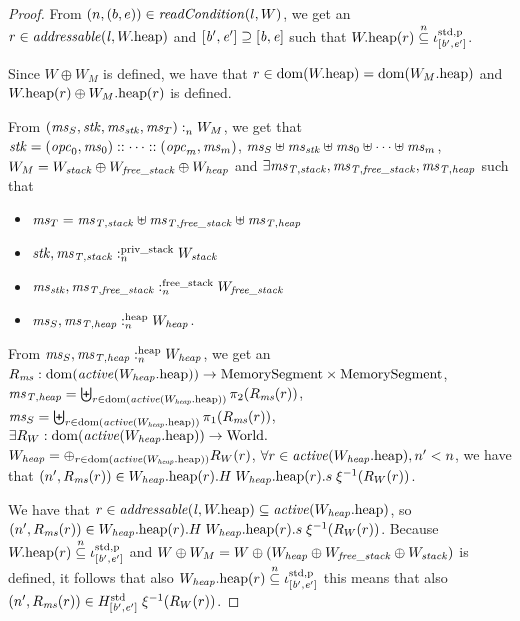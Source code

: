 \documentclass[a4paper]{article}
\begin{document}
\begin{proof}
  From $\npair{(b,e)}\in\readCond{l,W}$, we get an $r \in \addressable{\lin,
    \pwheap}$ and $[\baddr',\eaddr'] \supseteq [\baddr,\eaddr]$ such that $\pwheap(r)
  \nsubeq \stdreg{[\baddr',\eaddr']}{\pur}$.

  Since $W \oplus W_M$ is defined, we have that $r \in \dom(\pwheap) =
  \dom(\pwheap[W_M])$ and $\pwheap(r) \oplus \pwheap[W_M](r)$ is defined.

  From $\memSat{(\ms_S,\stk,\ms_\stk,\ms_T)}{W_M}$, we get that
  $\stk = (\opc_0,\ms_0):: \dots :: (\opc_m,\ms_m)$,
  $\ms_S \uplus \ms_\stk \uplus \ms_0 \uplus \dots \uplus \ms_m$,
  $W_M = W_{\var{stack}} \oplus W_{\var{free\_stack}} \oplus W_{\var{heap}}$ and
  $\exists \ms_\var{T,stack}, \ms_\var{T,free\_stack}, \ms_\var{T,heap}$ such that
  \begin{itemize}
  \item $\ms_T = \ms_\var{T,stack} \uplus \ms_\var{T,free\_stack} \uplus
    \ms_\var{T,heap}$
  \item $\memSatStack{\stk,\ms_\var{T,stack}}{W_{\var{stack}}}$
  \item $\memSatFStack{\ms_\stk,\ms_\var{T,free\_stack}}{W_{\var{free\_stack}}}$
  \item $\memSatHeap{\ms_S,\ms_\var{T,heap}}{W_\var{heap}}$.
  \end{itemize}

  From $\memSatHeap{\ms_S,\ms_\var{T,heap}}{W_\var{heap}}$, we get an
  $R_\ms : \dom(\activeReg{\pwheap[W_\var{heap}]}) \fun \MemSeg \times \MemSeg$,
  $\ms_\var{T,heap} = \biguplus_{r \in \dom(\activeReg{\pwheap[W_\var{heap}]})} \pi_2(R_\ms(r))$,
  $\ms_S = \biguplus_{r \in \dom(\activeReg{\pwheap[W_\var{heap}]})} \pi_1(R_\ms(r))$,
  $\exists R_W : \dom(\activeReg{\pwheap[W_\var{heap}]}) \fun \World\ldotp$
  $W_\var{heap} = \oplus_{r \in \dom(\activeReg{\pwheap[W_\var{heap}]})} R_W(r)$,
  $\forall r \in \activeReg{\pwheap[W_\var{heap}]}, n' < n$, we have that
  $\npair[n']{R_\ms(r)} \in  \pwheap[W_\var{heap}](r).H \; \pwheap[W_\var{heap}](r).s \; \xi^{-1}(R_W(r))$.

  We have that $r \in \addressable{\lin, \pwheap} \subseteq
  \activeReg{\pwheap[W_\var{heap}]}$, so $\npair[n']{R_\ms(r)} \in
  \pwheap[W_\var{heap}](r).H \; \pwheap[W_\var{heap}](r).s \; \xi^{-1}(R_W(r))$.
  Because $\pwheap(r) \nsubeq \stdreg{[\baddr',\eaddr']}{\pur}$ and $W\oplus W_M = W \oplus (W_\var{heap} \oplus W_\var{free\_stack} \oplus W_\var{stack})$ is defined, it follows that
  also $\pwheap[W_\var{heap}](r) \nsubeq \stdreg{[\baddr',\eaddr']}{\pur}$ this
  means that also $\npair[n']{R_\ms(r)} \in
  H^{\mathrm{std}}_{[\baddr',\eaddr']}\; \xi^{-1}(R_W(r))$.


\end{proof}
\end{document}
